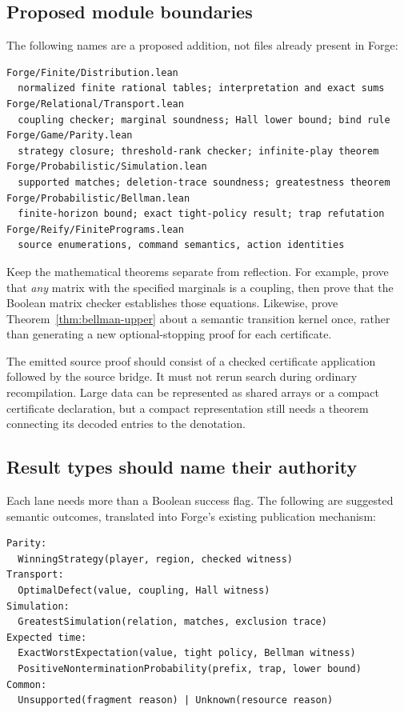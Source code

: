 \subsection{Proposed module boundaries}

The following names are a proposed addition, not files already present in
Forge:
\begin{lstlisting}
Forge/Finite/Distribution.lean
  normalized finite rational tables; interpretation and exact sums
Forge/Relational/Transport.lean
  coupling checker; marginal soundness; Hall lower bound; bind rule
Forge/Game/Parity.lean
  strategy closure; threshold-rank checker; infinite-play theorem
Forge/Probabilistic/Simulation.lean
  supported matches; deletion-trace soundness; greatestness theorem
Forge/Probabilistic/Bellman.lean
  finite-horizon bound; exact tight-policy result; trap refutation
Forge/Reify/FinitePrograms.lean
  source enumerations, command semantics, action identities
\end{lstlisting}

Keep the mathematical theorems separate from reflection. For example, prove
that \emph{any} matrix with the specified marginals is a coupling, then prove
that the Boolean matrix checker establishes those equations. Likewise, prove
Theorem~\ref{thm:bellman-upper} about a semantic transition kernel once, rather
than generating a new optional-stopping proof for each certificate.

The emitted source proof should consist of a checked certificate application
followed by the source bridge. It must not rerun search during ordinary
recompilation. Large data can be represented as shared arrays or a compact
certificate declaration, but a compact representation still needs a theorem
connecting its decoded entries to the denotation.

\subsection{Result types should name their authority}

Each lane needs more than a Boolean success flag. The following are suggested
semantic outcomes, translated into Forge's existing publication mechanism:
\begin{lstlisting}
Parity:
  WinningStrategy(player, region, checked witness)
Transport:
  OptimalDefect(value, coupling, Hall witness)
Simulation:
  GreatestSimulation(relation, matches, exclusion trace)
Expected time:
  ExactWorstExpectation(value, tight policy, Bellman witness)
  PositiveNonterminationProbability(prefix, trap, lower bound)
Common:
  Unsupported(fragment reason) | Unknown(resource reason)
\end{lstlisting}

